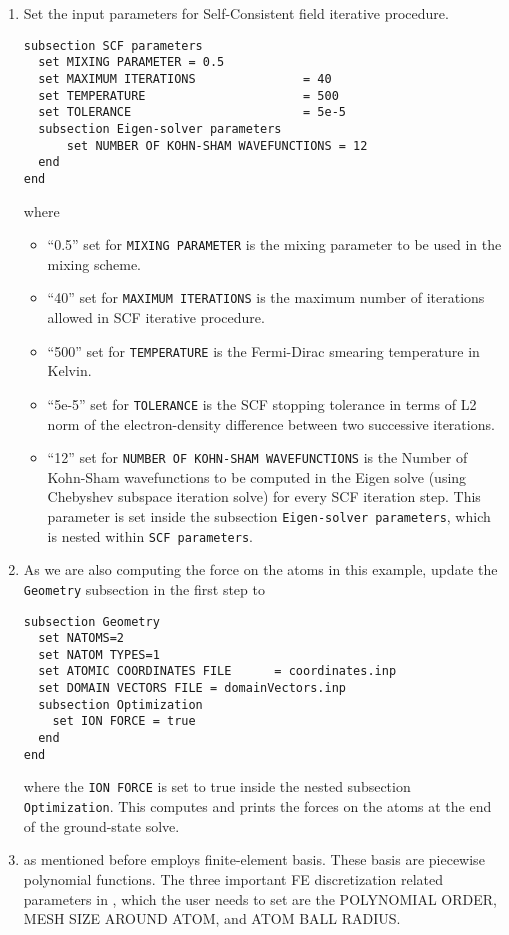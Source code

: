 \begin{enumerate}
\item Set the input parameters for Self-Consistent field iterative procedure.
\begin{verbatim}
subsection SCF parameters
  set MIXING PARAMETER = 0.5
  set MAXIMUM ITERATIONS               = 40
  set TEMPERATURE                      = 500
  set TOLERANCE                        = 5e-5
  subsection Eigen-solver parameters
      set NUMBER OF KOHN-SHAM WAVEFUNCTIONS = 12
  end
end	
\end{verbatim}
where
\begin{itemize}		
\item ``0.5'' set for \verb|MIXING PARAMETER| is the mixing parameter to be used in the mixing scheme.
\item ``40'' set for \verb|MAXIMUM ITERATIONS| is the maximum number of iterations allowed in SCF iterative procedure.
\item ``500'' set for \verb|TEMPERATURE| is the Fermi-Dirac smearing temperature in Kelvin.
\item ``5e-5'' set for \verb|TOLERANCE| is the SCF stopping tolerance in terms of L2 norm of the electron-density
difference between two successive iterations.
\item ``12'' set for \verb|NUMBER OF KOHN-SHAM WAVEFUNCTIONS| is the Number of Kohn-Sham wavefunctions to be computed in the Eigen solve (using Chebyshev subspace iteration solve) for every SCF iteration step. This parameter is set inside the subsection \verb|Eigen-solver parameters|, which is nested within \verb|SCF parameters|.
\end{itemize}

\item As we are also computing the force on the atoms in this example, update the \verb|Geometry| subsection in the first step to
\begin{verbatim}
subsection Geometry
  set NATOMS=2
  set NATOM TYPES=1
  set ATOMIC COORDINATES FILE      = coordinates.inp 
  set DOMAIN VECTORS FILE = domainVectors.inp
  subsection Optimization
    set ION FORCE = true
  end
end
\end{verbatim}
where the \verb|ION FORCE| is set to true inside the nested subsection \verb|Optimization|. This computes and prints the forces on the atoms at the end of the ground-state solve.

\item 
\dftfe{} as mentioned before employs finite-element basis. These basis are piecewise polynomial functions. The three important FE discretization related parameters in \dftfe{}, which the user needs to set are the POLYNOMIAL ORDER, MESH SIZE AROUND ATOM, and ATOM BALL RADIUS.


\end{enumerate}
